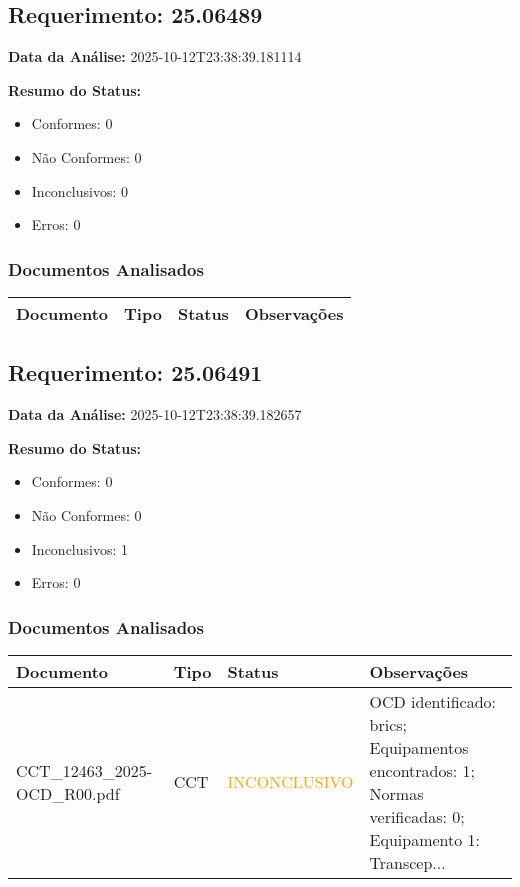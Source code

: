 \documentclass[12pt,a4paper]{article}
\begin{document}
\subsection{Requerimento: 25.06489}

\textbf{Data da Análise:} 2025-10-12T23:38:39.181114

\textbf{Resumo do Status:}
\begin{itemize}
    \item Conformes: 0
    \item Não Conformes: 0
    \item Inconclusivos: 0
    \item Erros: 0
\end{itemize}

\subsubsection{Documentos Analisados}

\begin{longtable}{|p{4cm}|p{2cm}|p{2cm}|p{6cm}|}
\hline
\textbf{Documento} & \textbf{Tipo} & \textbf{Status} & \textbf{Observações} \\
\hline
\endhead
\end{longtable}


\subsection{Requerimento: 25.06491}

\textbf{Data da Análise:} 2025-10-12T23:38:39.182657

\textbf{Resumo do Status:}
\begin{itemize}
    \item Conformes: 0
    \item Não Conformes: 0
    \item Inconclusivos: 1
    \item Erros: 0
\end{itemize}

\subsubsection{Documentos Analisados}

\begin{longtable}{|p{4cm}|p{2cm}|p{2cm}|p{6cm}|}
\hline
\textbf{Documento} & \textbf{Tipo} & \textbf{Status} & \textbf{Observações} \\
\hline
\endhead
CCT\_12463\_2025-OCD\_R00.pdf & CCT & \textcolor{orange}{INCONCLUSIVO} & OCD identificado: brics; Equipamentos encontrados: 1; Normas verificadas: 0; Equipamento 1: Transcep... \\
\hline
\end{longtable}
\end{document}
